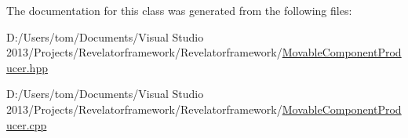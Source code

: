 The documentation for this class was generated from the following files\-:\begin{DoxyCompactItemize}
\item 
D\-:/\-Users/tom/\-Documents/\-Visual Studio 2013/\-Projects/\-Revelatorframework/\-Revelatorframework/\hyperlink{_movable_component_producer_8hpp}{Movable\-Component\-Producer.\-hpp}\item 
D\-:/\-Users/tom/\-Documents/\-Visual Studio 2013/\-Projects/\-Revelatorframework/\-Revelatorframework/\hyperlink{_movable_component_producer_8cpp}{Movable\-Component\-Producer.\-cpp}\end{DoxyCompactItemize}
